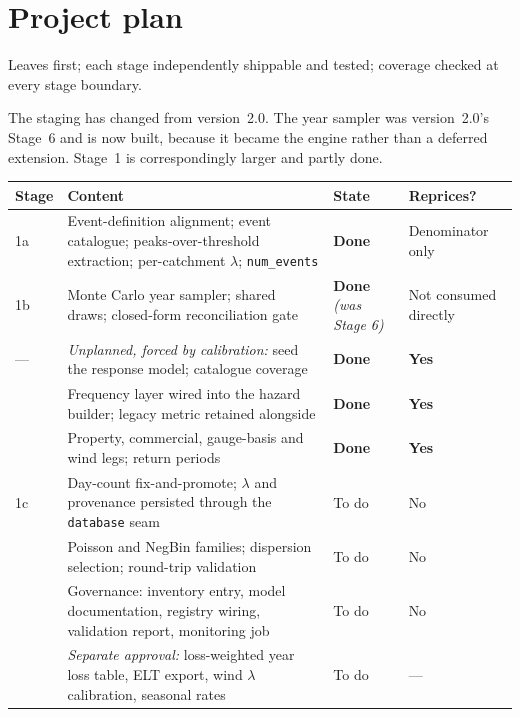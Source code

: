\documentclass[11pt]{article}
\begin{document}
\section{Project plan}

Leaves first; each stage independently shippable and tested; coverage checked at
every stage boundary.

The staging has changed from version~2.0. The year sampler was version~2.0's
Stage~6 and is now built, because it became the engine rather than a deferred
extension. Stage~1 is correspondingly larger and partly done.

\begin{longtable}{@{}p{}p{}p{}p{}@{}}
\toprule
\textbf{Stage} & \textbf{Content} & \textbf{State} & \textbf{Reprices?} \\
\midrule
\endhead
1a & Event-definition alignment; event catalogue; peaks-over-threshold
extraction; per-catchment $\lambda$; \texttt{num\_events} & \textbf{Done} &
Denominator only \\
\addlinespace
1b & Monte Carlo year sampler; shared draws; closed-form reconciliation gate &
\textbf{Done} \emph{(was Stage 6)} & Not consumed directly \\
\addlinespace
--- & \emph{Unplanned, forced by calibration:} seed the response model;
catalogue coverage & \textbf{Done} & \textbf{Yes} \\
\addlinespace
3 & Frequency layer wired into the hazard builder; legacy metric retained
alongside & \textbf{Done} & \textbf{Yes} \\
\addlinespace
4 & Property, commercial, gauge-basis and wind legs; return periods &
\textbf{Done} & \textbf{Yes} \\
\addlinespace
1c & Day-count fix-and-promote; $\lambda$ and provenance persisted through the
\texttt{database} seam & To do & No \\
\addlinespace
2 & Poisson and NegBin families; dispersion selection; round-trip validation &
To do & No \\
\addlinespace
5 & Governance: inventory entry, model documentation, registry wiring,
validation report, monitoring job & To do & No \\
\addlinespace
6 & \emph{Separate approval:} loss-weighted year loss table, ELT export, wind
$\lambda$ calibration, seasonal rates & To do & --- \\
\bottomrule
\end{longtable}
\end{document}
